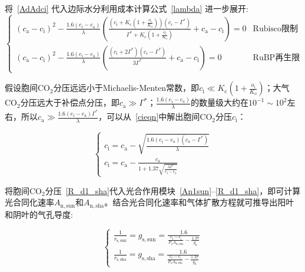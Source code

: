 将~\eqref{AdAdci} 代入边际水分利用成本计算公式~\eqref{lambda} 进一步展开:
\begin{equation}\label{cieqn}
\begin{cases}
    \left(c_{\mathrm{a}}-c_{\mathrm{i}}\right)^2-\frac{1.6\left(e_{\mathrm{i}}-e_{\mathrm{a}}\right)}{\lambda}\left(\frac{\left(c_{\mathrm{i}}+K_{\mathrm{c}}\left(1+\frac{o_{\mathrm{i}}}{K_{\mathrm{o}}}\right)\right)\left(c_i-\Gamma^*\right)}{\Gamma^*+K_{\mathrm{c}}\left(1+\frac{o_{\mathrm{i}}}{K_{\mathrm{o}}}\right)}+c_{\mathrm{a}}-c_{\mathrm{i}}\right)=0 & \text{Rubisco限制}  \\
    \left(c_{\mathrm{a}}-c_{\mathrm{i}}\right)^2-\frac{1.6\left(e_{\mathrm{i}}-e_{\mathrm{a}}\right)}{\lambda}\left(\frac{\left(c_{\mathrm{i}}+2\Gamma^*\right)\left(c_i-\Gamma^*\right)}{3\Gamma^*}+c_{\mathrm{a}}-c_{\mathrm{i}}\right)=0  & \text{RuBP再生限制}
\end{cases}
\end{equation}

假设胞间$\mathrm {CO_2}$分压远远小于Michaelis-Menten常数，即$c_{\mathrm{i}}\ll K_{\mathrm{c}}\left(1+\frac{o_{\mathrm{i}}}{K_{\mathrm{o}}}\right)$；大气$\mathrm {CO_2}$分压远大于补偿点分压，即$c_{\mathrm{a}}\gg\Gamma^*$；$\frac{1.6\left(e_{\mathrm{i}}-e_{\mathrm{a}}\right)}{\lambda}$的数量级大约在$10^{-1}\sim 10^{2}$左右，所以$c_{\mathrm{a}}\gg\frac{1.6\left(e_{\mathrm{i}}-e_{\mathrm{a}}\right)\Gamma^*}{\lambda}$，可以从~\eqref{cieqn}中解出胞间$\mathrm {CO_2}$分压$c_{\mathrm{i}}$：

\begin{equation}\label{cisolu}
    \begin{cases}
    c_{\mathrm{i}}=c_{\mathrm{a}} - \sqrt{\frac{1.6\left(e_{\mathrm{i}}-e_{\mathrm{a}}\right)\left(c_{\mathrm{a}}-\Gamma^*\right)}{\lambda}} \\
    c_{\mathrm{i}}=c_{\mathrm{a}} - \frac{c_{\mathrm{a}}}{1+1.37\sqrt{\frac{\lambda \Gamma^*}{e_{\mathrm{i}}-e_{\mathrm{a}}}}}
    \end{cases}
\end{equation}

将胞间$\mathrm {CO_2}$分压~\eqref{R_d1_sha}代入光合作用模块~\eqref{An1sun}--\eqref{R_d1_sha}，即可计算光合同化速率$A_{\mathrm{n,sun}}$和$A_{\mathrm{n,sha}}$。结合光合同化速率和气体扩散方程就可推导出阳叶和阴叶的气孔导度:

\begin{equation}\label{gssolu}
    \begin{cases}
    \frac{1}{r_{\mathrm{s,sun}}}=g_{\mathrm{s,sun}}=\frac{1.6} {\frac{c_{\mathrm{a}}-c_{\mathrm{i}}}{P_{\mathrm {a}} A_{\mathrm{n,sun}}} - \frac{1.37}{g_{\mathrm{b}}}}\\
    \frac{1}{r_{\mathrm{s,sha}}}=g_{\mathrm{s,sha}}=\frac{1.6} {\frac{c_{\mathrm{a}}-c_{\mathrm{i}}}{P_{\mathrm {a}} A_{\mathrm{n,sha}}} - \frac{1.37}{g_{\mathrm{b}}}}
    \end{cases}
\end{equation}


